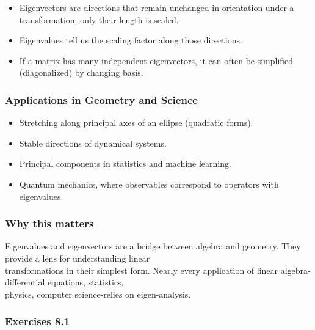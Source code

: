 \documentclass[
  12pt,
  a4paper,
]{article}
\begin{document}
\begin{itemize}
\item
  Eigenvectors are directions that remain unchanged in orientation under
  a transformation; only their length is scaled.
\item
  Eigenvalues tell us the scaling factor along those directions.
\item
  If a matrix has many independent eigenvectors, it can often be
  simplified (diagonalized) by changing basis.
\end{itemize}

\subsubsection{Applications in Geometry and
Science}\label{applications-in-geometry-and-science}

\begin{itemize}
\item
  Stretching along principal axes of an ellipse (quadratic forms).
\item
  Stable directions of dynamical systems.
\item
  Principal components in statistics and machine learning.
\item
  Quantum mechanics, where observables correspond to operators with
  eigenvalues.
\end{itemize}

\subsubsection{Why this matters}\label{why-this-matters-28}

Eigenvalues and eigenvectors are a bridge between algebra and geometry.
They provide a lens for understanding linear\\
transformations in their simplest form. Nearly every application of
linear algebra-differential equations, statistics,\\
physics, computer science-relies on eigen-analysis.

\subsubsection{Exercises 8.1}\label{exercises-81}
\end{document}
